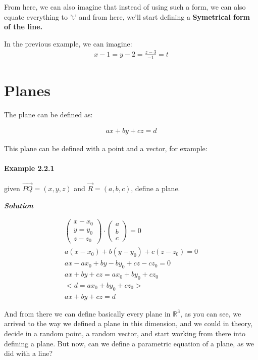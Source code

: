 \documentclass[11pt,fleqn]{book} %
\begin{document}
From here, we can also imagine that instead of using such a form, we can also equate everything to 't' and from here, we'll start defining a \textbf{Symetrical form of the line.}

In the previous example, we can imagine:
\begin{gather}
    x - 1 = y - 2 = \frac{z-3}{-1} = t    
\end{gather}

\section{Planes}

The plane can be defined as:

\begin{gather}
    ax + by + cz = d
\end{gather}

This plane can be defined with a point and a vector, for example:

\paragraph*{Example 2.2.1}
given $\vec{PQ} = (x,y,z)$ and $\vec{R} = (a,b,c)$, define a plane.

\textit{\textbf{Solution}}

\begin{gather}
    \begin{pmatrix}
        x - x_0 \\ y = y_0 \\ z - z_0
    \end{pmatrix} \cdot \begin{pmatrix}
        a\\b\\c
    \end{pmatrix} = 0\\
    a(x - x_0) + b(y - y_0) + c(z - z_0) = 0 \\
    ax - ax_0 + by - by_0 + cz - cz_0 = 0 \\
    ax + by + cz = ax_0 + by_0 + cz_0\\
    <d = ax_0 + by_0 + cz_0> \\
    ax + by + cz = d
\end{gather}

And from there we can define basically every plane in $\mathbb{R}^3$, as you can see, we arrived to the way we defined a plane in this dimension, and we could in theory, decide in a random point, a random vector, and start working from there into defining a plane.
But now, can we define a parametric equation of a plane, as we did with a line?
\end{document}
